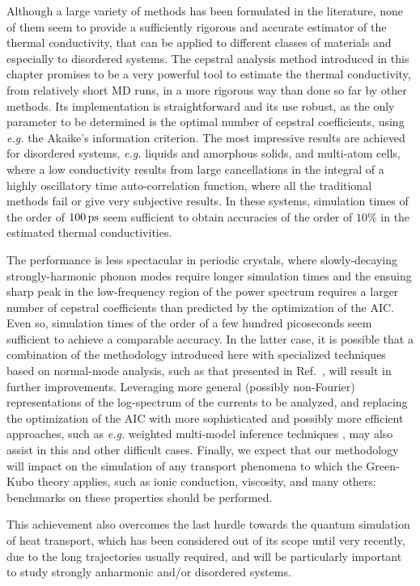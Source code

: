 \begin{LEtext}
Although a large variety of methods has been formulated in the literature, none of them seem to provide a sufficiently rigorous and accurate estimator of the thermal conductivity, that can be applied to different classes of materials and especially to disordered systems. 
The cepstral analysis method introduced in this chapter promises to be a very powerful tool to estimate the thermal conductivity, from relatively short MD runs, in a more rigorous way than done so far by other methods. 
Its implementation is straightforward and its use robust, as the only parameter to be determined is the optimal number of cepstral coefficients, using \emph{e.g.} the Akaike's information criterion.
The most impressive results are achieved for disordered systems, \emph{e.g.} liquids and amorphous solids, and multi-atom cells, where a low conductivity results from large cancellations in the integral of a highly oscillatory time auto-correlation function, where all the traditional methods fail or give very subjective results. In these systems, simulation times of the order of $100\,\mathrm{ps}$ seem sufficient to obtain accuracies of the order of $10\%$ in the estimated thermal conductivities. 

The performance is less spectacular in periodic crystals, where slowly-decaying strongly-harmonic phonon modes require longer simulation times and the ensuing sharp peak in the low-frequency region of the power spectrum requires a larger number of cepstral coefficients than predicted by the optimization of the AIC. Even so, simulation times of the order of a few hundred picoseconds seem sufficient to achieve a comparable accuracy. In the latter case, it is possible that a combination of the methodology introduced here with specialized techniques based on normal-mode analysis, such as that presented in Ref.~\cite{Carbogno:2017gc}, will result in further improvements. 
Leveraging more general (possibly non-Fourier) representations of the log-spectrum of the currents to be analyzed, and replacing the optimization of the AIC with more sophisticated and possibly more efficient approaches, such as \emph{e.g.} weighted multi-model inference techniques \cite{Burnham2004,Claeskens2008}, may also assist in this and other difficult cases. 
Finally, we expect that our methodology will impact on the simulation of any transport phenomena to which the Green-Kubo theory applies, such as ionic conduction, viscosity, and many others: benchmarks on these properties should be performed. 

This achievement also overcomes the last hurdle towards the quantum simulation of heat transport, which has been considered out of its scope until very recently, due to the long trajectories usually required, and will be particularly important to study strongly anharmonic and/or disordered systems. 

\end{LEtext}
